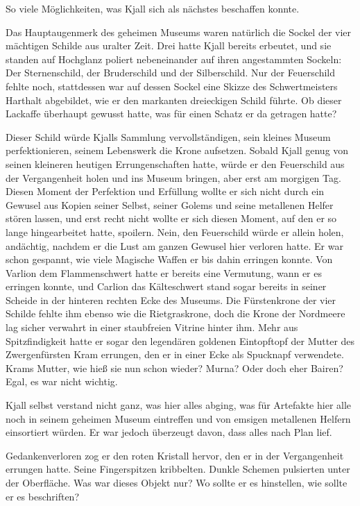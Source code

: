 So viele Möglichkeiten, was Kjall sich als nächstes beschaffen konnte.

Das Hauptaugenmerk des geheimen Museums waren natürlich die Sockel der vier mächtigen Schilde aus uralter Zeit. Drei hatte Kjall bereits erbeutet, und sie standen auf Hochglanz poliert nebeneinander auf ihren angestammten Sockeln: Der Sternenschild, der Bruderschild und der Silberschild. Nur der Feuerschild fehlte noch, stattdessen war auf dessen Sockel eine Skizze des Schwertmeisters Harthalt abgebildet, wie er den markanten dreieckigen Schild führte. Ob dieser Lackaffe überhaupt gewusst hatte, was für einen Schatz er da getragen hatte?

Dieser Schild würde Kjalls Sammlung vervollständigen, sein kleines Museum perfektionieren, seinem Lebenswerk die Krone aufsetzen. Sobald Kjall genug von seinen kleineren heutigen Errungenschaften hatte, würde er den Feuerschild aus der Vergangenheit holen und ins Museum bringen, aber erst am morgigen Tag. Diesen Moment der Perfektion und Erfüllung wollte er sich nicht durch ein Gewusel aus Kopien seiner Selbst, seiner Golems und seine metallenen Helfer stören lassen, und erst recht nicht wollte er sich diesen Moment, auf den er so lange hingearbeitet hatte, spoilern. Nein, den Feuerschild würde er allein holen, andächtig, nachdem er die Lust am ganzen Gewusel hier verloren hatte. Er war schon gespannt, wie viele Magische Waffen er bis dahin erringen konnte. Von Varlion dem Flammenschwert hatte er bereits eine Vermutung, wann er es erringen konnte, und Carlion das Kälteschwert stand sogar bereits in seiner Scheide in der hinteren rechten Ecke des Museums. Die Fürstenkrone der vier Schilde fehlte ihm ebenso wie die Rietgraskrone, doch die Krone der Nordmeere lag sicher verwahrt in einer staubfreien Vitrine hinter ihm. Mehr aus Spitzfindigkeit hatte er sogar den legendären goldenen Eintopftopf der Mutter des Zwergenfürsten Kram errungen, den er in einer Ecke als Spucknapf verwendete. Krams Mutter, wie hieß sie nun schon wieder? Murna? Oder doch eher Bairen? Egal, es war nicht wichtig.

Kjall selbst verstand nicht ganz, was hier alles abging, was für Artefakte hier alle noch in seinem geheimen Museum eintreffen und von emsigen metallenen Helfern einsortiert würden. Er war jedoch überzeugt davon, dass alles nach Plan lief.

Gedankenverloren zog er den roten Kristall hervor, den er in der Vergangenheit errungen hatte. Seine Fingerspitzen kribbelten. Dunkle Schemen pulsierten unter der Oberfläche. Was war dieses Objekt nur? Wo sollte er es hinstellen, wie sollte er es beschriften?

